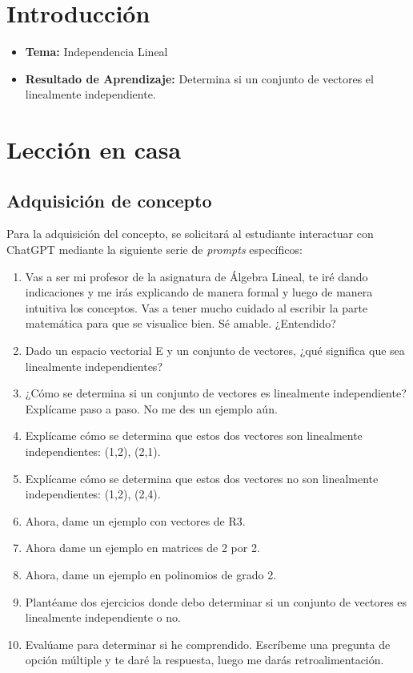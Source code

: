 \documentclass[a4,11pt]{aleph-notas}
\begin{document}
\encabezado

\vspace*{-10mm}
\section*{Introducción}

\begin{itemize}
    \item \textbf{Tema:} Independencia Lineal
    \item \textbf{Resultado de Aprendizaje:} Determina si un conjunto de vectores el linealmente independiente.
\end{itemize}

\section{Lección en casa}

\subsection{Adquisición de concepto}

Para la adquisición del concepto, se solicitará al estudiante interactuar con ChatGPT mediante la siguiente serie de \textit{prompts} específicos:

\begin{enumerate}[label=\textit{Prompt \arabic*.},leftmargin=2.1cm]
    \item Vas a ser mi profesor de la asignatura de Álgebra Lineal, te iré dando indicaciones y me irás explicando de manera formal y luego de manera intuitiva los conceptos. Vas a tener mucho cuidado al escribir la parte matemática para que se visualice bien. Sé amable. ¿Entendido?
    \item Dado un espacio vectorial E y un conjunto de vectores, ¿qué significa que sea linealmente independientes?
    \item ¿Cómo se determina si un conjunto de vectores es linealmente independiente? Explícame paso a paso. No me des un ejemplo aún.
    \item Explícame cómo se determina que estos dos vectores son linealmente independientes: (1,2), (2,1). 
    \item Explícame cómo se determina que estos dos vectores no son linealmente independientes: (1,2), (2,4). 
    \item Ahora, dame un ejemplo con vectores de R3.
    \item Ahora dame un ejemplo en matrices de 2 por 2.
    \item Ahora, dame un ejemplo en polinomios de grado 2.
    \item Plantéame dos ejercicios donde debo determinar si un conjunto de vectores es linealmente independiente o no.
    \item Evalúame para determinar si he comprendido. Escríbeme una pregunta de opción múltiple y te daré la respuesta, luego me darás retroalimentación.
\end{enumerate}
\end{document}
